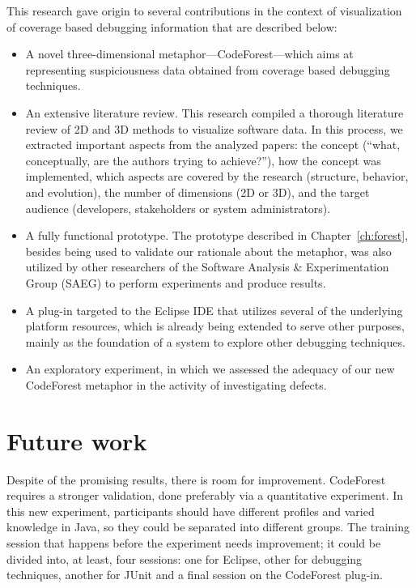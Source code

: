This research gave origin to several contributions in the context of
visualization of coverage based debugging information that are described below:

\begin{itemize}
    \item A novel three-dimensional metaphor---CodeForest---which aims at
    representing suspiciousness data obtained from coverage based debugging
    techniques.
    \item An extensive literature review. This research compiled a thorough
literature review of 2D and 3D methods to visualize software data. In this
process, we extracted important aspects from the analyzed papers: the concept
(``what, conceptually, are the authors trying to achieve?''), how the concept
was implemented, which aspects are covered by the research (structure, behavior,
and evolution), the number of dimensions (2D or 3D), and the target audience
(developers, stakeholders or system administrators).
    \item A fully functional prototype. The prototype described in
Chapter~\ref{ch:forest}, besides being used to validate our rationale about the
metaphor, was also utilized by other researchers of the Software Analysis \&
Experimentation Group (SAEG) to perform experiments and produce results.
    \item A plug-in targeted to the Eclipse IDE that utilizes several of the
    underlying platform resources, which is already being extended to serve
    other purposes, mainly as the foundation of a system to explore other
    debugging techniques.
    \item An exploratory experiment, in which we assessed the adequacy of our
    new CodeForest metaphor in the activity of investigating defects.
\end{itemize}

\section{Future work}

Despite of the promising results, there is room for improvement. CodeForest
requires a stronger validation, done preferably via a quantitative experiment.
In this new experiment, participants should have different profiles and varied
knowledge in Java, so they could be separated into different groups. The
training session that happens before the experiment needs improvement; it could
be divided into, at least, four sessions: one for Eclipse, other for debugging
techniques, another for JUnit and a final session on the CodeForest plug-in.

